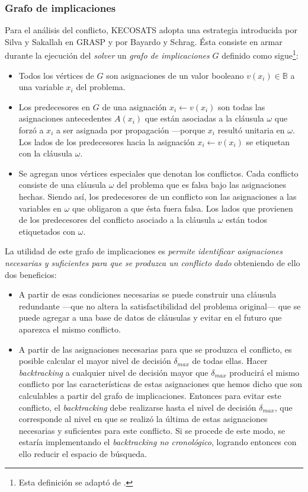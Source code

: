\documentclass[12pt,lettersize,oneside]{article}
\begin{document}
\subsubsection{Grafo de implicaciones}
Para el análisis del conflicto, KECOSATS adopta una estrategia introducida por
Silva y Sakallah en GRASP y por Bayardo y Schrag. \'Esta consiste en armar
durante la ejecución del \emph{solver} un \emph{grafo de implicaciones} $G$
definido como sigue\footnote{Esta definición se adaptó de \cite{grasp96}.}:
\begin{itemize}\vspace{-2.5mm}
\item Todos los vértices de $G$ son asignaciones de un valor booleano $v(x_i)
  \in \mathbb{B}$ a una variable $x_i$ del problema.
\item Los predecesores en $G$ de una asignación $x_i \gets v(x_i)$ son todas las
  asignaciones antecedentes $A(x_i)$ que están asociadas a la cláusula $\omega$
  que forzó a $x_i$ a ser asignada por propagación ---porque $x_i$ resultó
  unitaria en $\omega$. Los lados de los predecesores hacia la asignación $x_i
  \gets v(x_i)$ se etiquetan con la cláusula $\omega$.
\item Se agregan unos vértices especiales que denotan los conflictos. Cada
  conflicto consiste de una cláusula $\omega$ del problema que es falsa bajo las
  asignaciones hechas. Siendo así, los predecesores de un conflicto son las
  asignaciones a las variables en $\omega$ que obligaron a que ésta fuera
  falsa. Los lados que provienen de los predecesores del conflicto asociado a la
  cláusula $\omega$ están todos etiquetados con $\omega$.
\end{itemize}\vspace{-2.5mm}

La utilidad de este grafo de implicaciones es \emph{permite identificar
  asignaciones necesarias y suficientes para que se produzca un conflicto dado}
obteniendo de ello dos beneficios:
\begin{itemize}
\item A partir de esas condiciones necesarias se puede construir una cláusula
  redundante ---que no altera la satisfactibilidad del problema original--- que
  se puede agregar a una base de datos de cláusulas y evitar en el futuro que
  aparezca el mismo conflicto.
\item A partir de las asignaciones necesarias para que se produzca el conflicto,
  es posible calcular el mayor nivel de decisión $\delta_{max}$ de todas
  ellas. Hacer \emph{backtracking} a cualquier nivel de decisión mayor que
  $\delta_{max}$ producirá el mismo conflicto por las características de estas
  asignaciones que hemos dicho que son calculables a partir del grafo de
  implicaciones. Entonces para evitar este conflicto, el \emph{backtracking}
  debe realizarse hasta el nivel de decisión $\delta_{max}$, que corresponde al
  nivel en que se realizó la última de estas asignaciones necesarias y
  suficientes para este conflicto. Si se procede de este modo, se estaría
  implementando el \emph{backtracking no cronológico}, logrando entonces con
  ello reducir el espacio de búsqueda.
\end{itemize}
\end{document}
